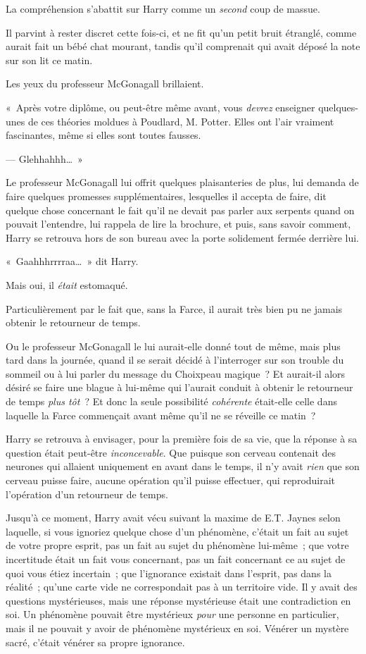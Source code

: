 La compréhension s'abattit sur Harry comme un \emph{second} coup de massue.

Il parvint à rester discret cette fois-ci, et ne fit qu'un petit bruit étranglé, comme aurait fait un bébé chat mourant, tandis qu'il comprenait qui avait déposé la note sur son lit ce matin.

Les yeux du professeur McGonagall brillaient.

«~Après votre diplôme, ou peut-être même avant, vous \emph{devrez} enseigner quelques-unes de ces théories moldues à Poudlard, M. Potter. Elles ont l'air vraiment fascinantes, même si elles sont toutes fausses.

--- Glehhahhh…~»

Le professeur McGonagall lui offrit quelques plaisanteries de plus, lui demanda de faire quelques promesses supplémentaires, lesquelles il accepta de faire, dit quelque chose concernant le fait qu'il ne devait pas parler aux serpents quand on pouvait l'entendre, lui rappela de lire la brochure, et puis, sans savoir comment, Harry se retrouva hors de son bureau avec la porte solidement fermée derrière lui.

«~Gaahhhrrrraa…~» dit Harry.

Mais oui, il \emph{était} estomaqué.

Particulièrement par le fait que, sans la Farce, il aurait très bien pu ne jamais obtenir le retourneur de temps.

Ou le professeur McGonagall le lui aurait-elle donné tout de même, mais plus tard dans la journée, quand il se serait décidé à l'interroger sur son trouble du sommeil ou à lui parler du message du Choixpeau magique~? Et aurait-il alors désiré se faire une blague à lui-même qui l'aurait conduit à obtenir le retourneur de temps \emph{plus tôt}~? Et donc la seule possibilité \emph{cohérente} était-elle celle dans laquelle la Farce commençait avant même qu'il ne se réveille ce matin~?

Harry se retrouva à envisager, pour la première fois de sa vie, que la réponse à sa question était peut-être \emph{inconcevable}. Que puisque son cerveau contenait des neurones qui allaient uniquement en avant dans le temps, il n'y avait \emph{rien} que son cerveau puisse faire, aucune opération qu'il puisse effectuer, qui reproduirait l'opération d'un retourneur de temps.

Jusqu'à ce moment, Harry avait vécu suivant la maxime de E.T. Jaynes selon laquelle, si vous ignoriez quelque chose d'un phénomène, c'était un fait au sujet de votre propre esprit, pas un fait au sujet du phénomène lui-même~; que votre incertitude était un fait vous concernant, pas un fait concernant ce au sujet de quoi vous étiez incertain~; que l'ignorance existait dans l'esprit, pas dans la réalité~; qu'une carte vide ne correspondait pas à un territoire vide. Il y avait des questions mystérieuses, mais une réponse mystérieuse était une contradiction en soi. Un phénomène pouvait être mystérieux \emph{pour} une personne en particulier, mais il ne pouvait y avoir de phénomène mystérieux en soi. Vénérer un mystère sacré, c'était vénérer sa propre ignorance.

